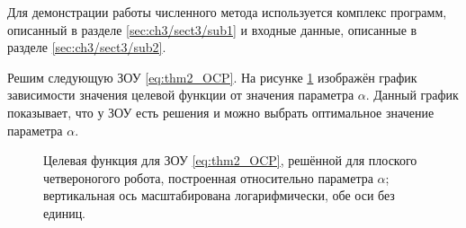 Для демонстрации работы численного метода используется комплекс программ, описанный в разделе \ref{sec:ch3/sect3/sub1} и входные данные, описанные в разделе \ref{sec:ch3/sect3/sub2}.

Решим следующую ЗОУ \eqref{eq:thm2_OCP}.
%
На рисунке \ref{fig:output_cost} изображён график зависимости значения целевой функции от значения параметра $\alpha$. Данный график показывает, что у ЗОУ есть решения и можно выбрать оптимальное значение параметра $\alpha$.

\begin{figure}[ht]
	\caption{Целевая функция для ЗОУ \eqref{eq:thm2_OCP}, решённой для плоского четвероногого робота, построенная относительно параметра $\alpha$; вертикальная ось масштабирована логарифмически, обе оси без единиц.} \label{fig:output_cost}
\end{figure}